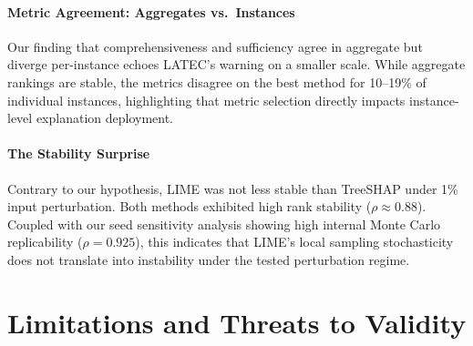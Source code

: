 \documentclass[conference, 10pt]{IEEEtran}
\begin{document}
\paragraph{Metric Agreement: Aggregates vs.\ Instances}
Our finding that comprehensiveness and sufficiency agree in aggregate but diverge per-instance echoes LATEC's warning on a smaller scale. While aggregate rankings are stable, the metrics disagree on the best method for 10--19\% of individual instances, highlighting that metric selection directly impacts instance-level explanation deployment.

\paragraph{The Stability Surprise}
Contrary to our hypothesis, LIME was not less stable than TreeSHAP under 1\% input perturbation. Both methods exhibited high rank stability ($\rho \approx 0.88$). Coupled with our seed sensitivity analysis showing high internal Monte Carlo replicability ($\rho = 0.925$), this indicates that LIME's local sampling stochasticity does not translate into instability under the tested perturbation regime.

\section{Limitations and Threats to Validity}
\label{sec:limitations}
\end{document}
